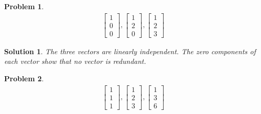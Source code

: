\documentclass{article}
\newtheorem{problem}{Problem}
\newtheorem*{solution}{Solution}
\begin{document}
\begin{problem}
\begin{align*}
\begin{bmatrix} 1 \\ 0 \\ 0 \end{bmatrix}, 
\begin{bmatrix} 1 \\ 2 \\ 0 \end{bmatrix},
\begin{bmatrix} 1 \\ 2 \\ 3 \end{bmatrix}
\end{align*}
\end{problem}

\begin{solution}
The three vectors are linearly independent. The zero components of each vector show that no vector is redundant.
\end{solution}

\begin{problem}
\begin{align*}
\begin{bmatrix} 1 \\ 1 \\ 1 \end{bmatrix}, 
\begin{bmatrix} 1 \\ 2 \\ 3 \end{bmatrix},
\begin{bmatrix} 1 \\ 3 \\ 6 \end{bmatrix}
\end{align*}
\end{problem}
\end{document}
